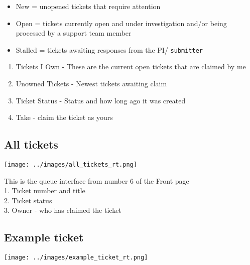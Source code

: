 \documentclass[
  letterpaper,
  DIV=11,
  numbers=noendperiod]{scrreprt}
\providecommand{\tightlist}{%
  \setlength{\itemsep}{0pt}\setlength{\parskip}{0pt}}\usepackage{longtable,booktabs,array}
\begin{document}
\begin{itemize}
\tightlist
\item
  New = unopened tickets that require attention\\
\item
  Open = tickets currently open and under investigation and/or being
  processed by a support team member\\
\item
  Stalled = tickets awaiting responses from the PI/ \texttt{submitter}\\
\end{itemize}

\begin{enumerate}
\def\labelenumi{\arabic{enumi}.}
\setcounter{enumi}{6}
\tightlist
\item
  Tickets I Own - These are the current open tickets that are claimed by
  me\\
\item
  Unowned Tickets - Newest tickets awaiting claim\\
\item
  Ticket Status - Status and how long ago it was created\\
\item
  Take - claim the ticket as yours
\end{enumerate}

\hypertarget{all-tickets}{%
\subsection{All tickets}\label{all-tickets}}

\texttt{[image: ../images/all\_tickets\_rt.png]}

This is the queue interface from number 6 of the Front page\\
1. Ticket number and title\\
2. Ticket status\\
3. Owner - who has claimed the ticket

\hypertarget{example-ticket}{%
\subsection{Example ticket}\label{example-ticket}}

\texttt{[image: ../images/example\_ticket\_rt.png]}
\end{document}
